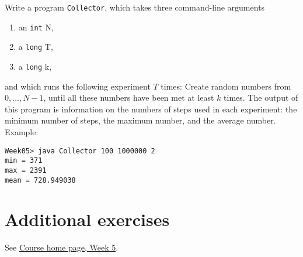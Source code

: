 \documentclass[11pt]{article}
\begin{document}
Write a program \texttt{Collector}, which takes three command-line arguments
\begin{enumerate}
\item an \texttt{int} N,
\item a \texttt{long} T,
\item a \texttt{long} k,
\end{enumerate}
and which runs the following experiment $T$ times: Create random numbers from $0, \dots, N-1$, until all these numbers have been met at least $k$ times. The output of this program is information on the numbers of steps used in each experiment: the minimum number of steps, the maximum number, and the average number. Example:
\begin{verbatim}
Week05> java Collector 100 1000000 2
min = 371
max = 2391
mean = 728.949038
\end{verbatim}


\section{Additional exercises}
\label{sec:addex}

See \href{\chp#ExercisesWeek05}{Course home page, Week 5}.
\end{document}
